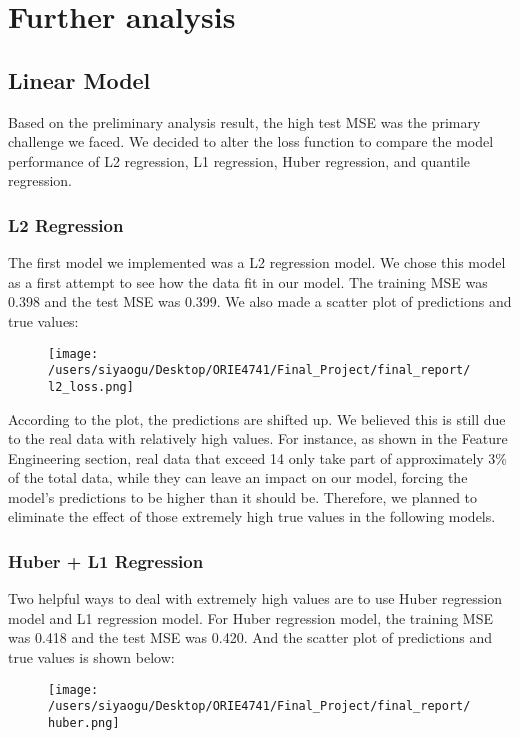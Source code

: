 \documentclass[journal, a4paper,11pt]{IEEEtran}
\begin{document}
\section{Further analysis}

\subsection{Linear Model}
	Based on the preliminary analysis result, the high test MSE was the primary challenge we faced. We decided to alter the loss function to compare the model performance of L2 regression, L1 regression, Huber regression, and quantile regression.

\subsubsection{L2 Regression}
	The first model we implemented was a L2 regression model. We chose this model as a first attempt to see how the data fit in our model. The training MSE was 0.398 and the test MSE was 0.399. We also made a scatter plot of predictions and true values:
	
	\bigbreak
	
	\begin{figure}[ht]
	\centering
	\texttt{[image: /users/siyaogu/Desktop/ORIE4741/Final\_Project/final\_report/l2\_loss.png]}
	\end{figure}
	
	According to the plot, the predictions are shifted up. We believed this is still due to the real data with relatively high values. For instance, as shown in the Feature Engineering section, real data that exceed 14 only take part of approximately 3\% of the total data, while they can leave an impact on our model, forcing the model's predictions to be higher than it should be. Therefore, we planned to eliminate the effect of those extremely high true values in the following models.

\subsubsection{Huber + L1 Regression}
	Two helpful ways to deal with extremely high values are to use Huber regression model and L1 regression model.
	For Huber regression model, the training MSE was 0.418 and the test MSE was 0.420. And the scatter plot of predictions and true values is shown below:
	
	\begin{figure}[ht]
	\centering
	\texttt{[image: /users/siyaogu/Desktop/ORIE4741/Final\_Project/final\_report/huber.png]}
	\end{figure}
	
\end{document}

